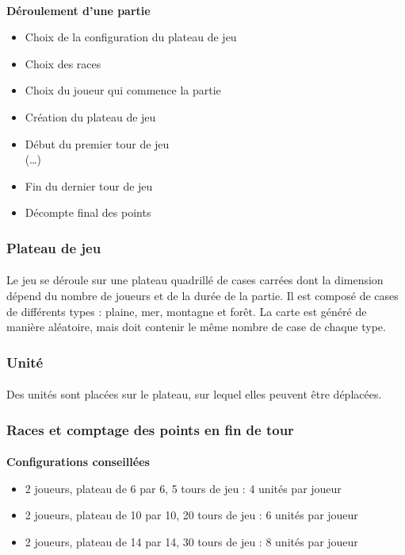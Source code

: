 \documentclass[a4paper]{article}
\begin{document}
\paragraph{}
\textbf{Déroulement d'une partie}
\begin{itemize}
    \item Choix de la configuration du plateau de jeu
    \item Choix des races
    \item Choix du joueur qui commence la partie
    \item Création du plateau de jeu
    \item Début du premier tour de jeu\\(\dots)
    \item Fin du dernier tour de jeu
    \item Décompte final des points
\end{itemize}

\subsubsection{Plateau de jeu}
\paragraph{}
Le jeu se déroule sur une plateau quadrillé de cases carrées dont la dimension dépend du nombre de joueurs et de la durée de la partie.\label{map_gen} Il est composé de cases de différents types : plaine, mer, montagne et forêt. La carte est généré de manière aléatoire, mais doit contenir le même nombre de case de chaque type.

\subsubsection{Unité}
\paragraph{}
Des unités sont placées sur le plateau, sur lequel elles peuvent être déplacées.

\subsubsection{Races et comptage des points en fin de tour}

\paragraph{}
\textbf{Configurations conseillées}
\begin{itemize}
    \item 2 joueurs, plateau de 6 par 6, 5 tours de jeu : 4 unités par joueur
    \item 2 joueurs, plateau de 10 par 10, 20 tours de jeu : 6 unités par joueur
    \item 2 joueurs, plateau de 14 par 14, 30 tours de jeu : 8 unités par joueur
\end{itemize}
\end{document}
